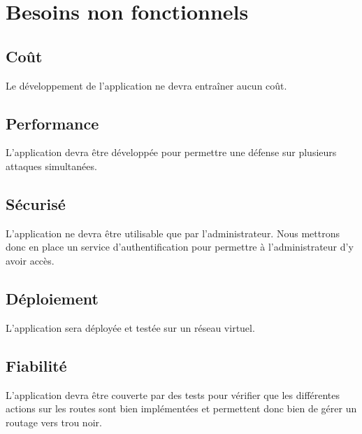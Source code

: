 \newpage




\section{Besoins non fonctionnels}

\subsection{Coût}
Le développement de l'application ne devra entraîner aucun coût.

\subsection{Performance}
L'application devra être développée pour permettre une défense sur plusieurs attaques simultanées.

\subsection{Sécurisé}
L’application ne devra être utilisable que par l'administrateur. Nous mettrons donc en place un service d'authentification pour permettre à l'administrateur d'y avoir accès.

\subsection{Déploiement}
L'application sera déployée et testée sur un réseau virtuel.

\subsection{Fiabilité}
L'application devra être couverte par des tests pour vérifier que les différentes actions sur les routes sont bien implémentées et permettent donc bien de gérer un routage vers trou noir.




